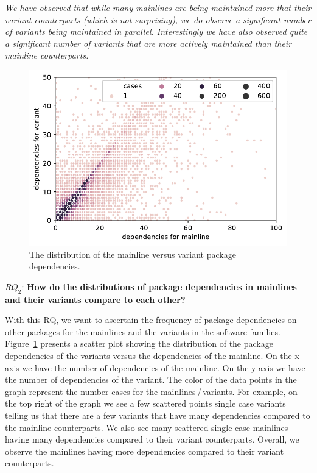 \begin{framed}
\noindent
\emph{We have observed that while many mainlines are being maintained more that their variant counterparts (which is not surprising), we do observe a significant number of variants being maintained in parallel. Interestingly we have also observed quite a significant number of variants that are more actively maintained than their mainline counterparts.}
\end{framed}

\begin{figure}[htbp]
\vspace{-.3cm}
   \centering
    \includegraphics[scale=0.6]{figures/benevolj_dependencies.pdf}
    \caption{The distribution of the mainline versus variant package dependencies.}
    \label{fig:dependencies}
\end{figure}


$RQ_2$: \textbf{How do the distributions of package dependencies in mainlines and their variants compare to each other?}

With this RQ, we want to ascertain the frequency of package dependencies on other packages for the mainlines and the variants in the software families. 
Figure~\ref{fig:dependencies} presents a scatter plot showing the distribution of the package dependencies of the variants versus the dependencies of the mainline.
On the x-axis we have the number of dependencies of the mainline. 
On the y-axis we have the number of dependencies of the variant.
The color of the data points in the graph represent the number cases for the mainlines\,/\,variants.
For example, on the top right of the graph we see a few scattered points single case variants telling us that there are a few variants that have many dependencies compared to the mainline counterparts.
We also see many scattered single case mainlines having many dependencies compared to their variant counterparts. 
Overall, we observe the mainlines having more dependencies compared to their variant counterparts.

